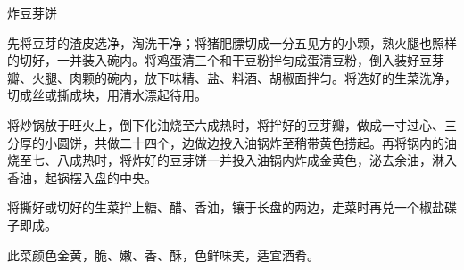 \begin{recipe}{炸豆芽饼}

\ingredients



\cooking

\step 先将豆芽的渣皮选净，淘洗干净；将猪肥膘切成一分五见方的小颗，熟火腿也照样的切好，一并装入碗内。将鸡蛋清三个和干豆粉拌匀成蛋清豆粉，倒入装好豆芽瓣、火腿、肉颗的碗内，放下味精、盐、料酒、胡椒面拌匀。将选好的生菜洗净，切成丝或撕成块，用清水漂起待用。

\step 将炒锅放于旺火上，倒下化油烧至六成热时，将拌好的豆芽瓣，做成一寸过心、三分厚的小圆饼，共做二十四个，边做边投入油锅炸至稍带黄色捞起。再将锅内的油烧至七、八成热时，将炸好的豆芽饼一并投入油锅内炸成金黄色，泌去余油，淋入香油，起锅摆入盘的中央。

\step 将撕好或切好的生菜拌上糖、醋、香油，镶于长盘的两边，走菜时再兑一个椒盐碟子即成。

\notes

此菜颜色金黄，脆、嫩、香、酥，色鲜味美，适宜酒肴。

\end{recipe}

